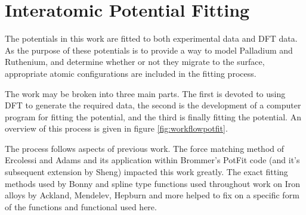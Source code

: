 
\section{Interatomic Potential Fitting}

The potentials in this work are fitted to both experimental data and DFT data.  As the purpose of these potentials is to provide a way to model Palladium and Ruthenium, and determine whether or not they migrate to the surface, appropriate atomic configurations are included in the fitting process.

The work may be broken into three main parts.  The first is devoted to using DFT to generate the required data, the second is the development of a computer program for fitting the potential, and the third is finally fitting the potential.  An overview of this process is given in figure \ref{fig:workflowpotfit}.

The process follows aspects of previous work.  The force matching method of Ercolessi and Adams\cite{forcematchingmethod} and its application within Brommer's PotFit code\cite{pbrommer} (and it's subsequent extension by Sheng\cite{shengeam}) impacted this work greatly.  The exact fitting methods used by Bonny and spline type functions used throughout work on Iron alloys by Ackland, Mendelev, Hepburn and more helped to fix on a specific form of the functions and functional used here.

